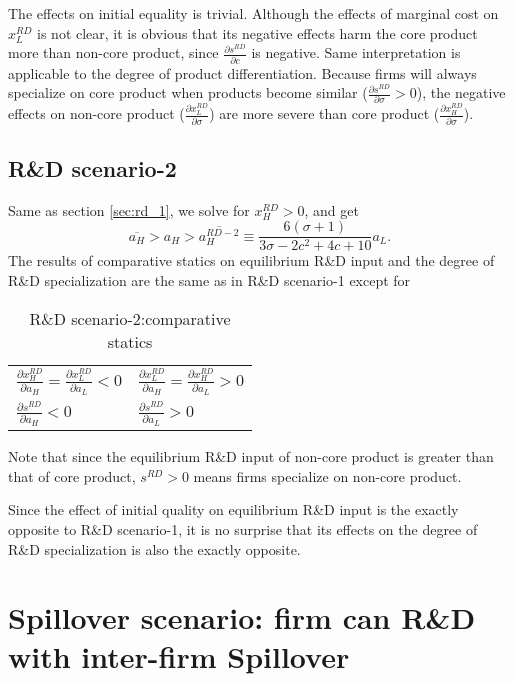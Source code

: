 \documentclass[12pt]{article}
\begin{document}
The effects on initial equality is trivial.
Although the effects of marginal cost on $x_L^{RD}$ is not clear, it is obvious that its negative effects harm the core product more than non-core product, since $\frac{\partial s^{RD}}{\partial c}$ is negative.
Same interpretation is applicable to the degree of product differentiation.
Because firms will always specialize on core product when products become similar ($\frac{\partial s^{RD}}{\partial \sigma} > 0$), the negative effects on non-core product ($\frac{\partial x_L^{RD}}{\partial \sigma}$) are more severe than core product ($\frac{\partial x_H^{RD}}{\partial \sigma}$).


\subsection{R\&D scenario-2}
\label{sec:rd_2}

Same as section \ref{sec:rd_1}, we solve for $x_H^{RD} > 0$, and get
\begin{equation}
    \overline{a_H} > a_H > \overline{a_H^{RD-2}} \equiv \frac{6 (\sigma + 1)}{3 \sigma - 2 c^2 + 4 c + 10} a_L.
    \label{eq:xH_pos}
    \tag{C4}
\end{equation}
The results of comparative statics on equilibrium R\&D input and the degree of R\&D specialization are the same as in R\&D scenario-1 except for
\begin{table}[h]
    \centering
    \caption{R\&D scenario-2:comparative statics}
    \label{tab:rd_2_com}
    \begin{tabular}{ll}
        $\frac{\partial x_H^{RD}}{\partial a_H} = \frac{\partial x_L^{RD}}{\partial a_L} < 0$ & $\frac{\partial x_L^{RD}}{\partial a_H} = \frac{\partial x_H^{RD}}{\partial a_L} > 0$ \\
        $\frac{\partial s^{RD}}{\partial a_H} < 0$ & $\frac{\partial s^{RD}}{\partial a_L} > 0$ \\
    \end{tabular}
\end{table}

Note that since the equilibrium R\&D input of non-core product is greater than that of core product, $s^{RD} > 0$ means firms specialize on non-core product.

Since the effect of initial quality on equilibrium R\&D input is the exactly opposite to R\&D scenario-1, it is no surprise that its effects on the degree of R\&D specialization is also the exactly opposite.

\section{Spillover scenario: firm can R\&D with inter-firm Spillover} \label{sec:spillover}
\end{document}
